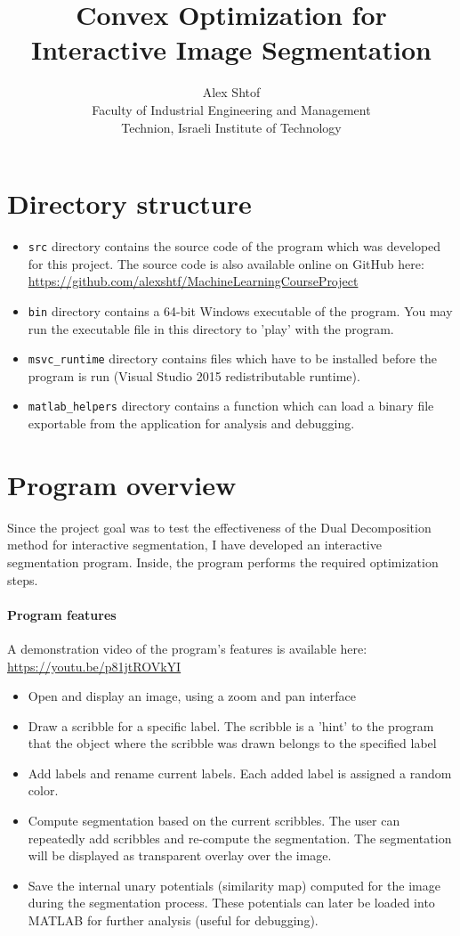 \documentclass[12pt,a4paper]{article}
\title{Convex Optimization for Interactive Image Segmentation}
\author{Alex Shtof \\
        Faculty of Industrial Engineering and Management \\
        Technion, Israeli Institute of Technology}
\begin{document}
\maketitle

\section{Directory structure}
\begin{itemize}
	\item \texttt{src} directory contains the source code of the program which was developed for this project. The source code is also available online on GitHub here: \href{https://github.com/alexshtf/MachineLearningCourseProject}{https://github.com/alexshtf/MachineLearningCourseProject}
	\item \texttt{bin} directory contains a 64-bit Windows executable of the program. You may run the executable file in this directory to 'play' with the program.
	\item \texttt{msvc\_runtime} directory contains files which have to be installed before the program is run (Visual Studio 2015 redistributable runtime). 
	\item \texttt{matlab\_helpers} directory contains a function which can load a binary file exportable from the application for analysis and debugging.
\end{itemize}


\section{Program overview}
Since the project goal was to test the effectiveness of the Dual Decomposition method for interactive segmentation, I have developed an interactive segmentation program. Inside, the program performs the required optimization steps. 

\paragraph{Program features}
A demonstration video of the program's features is available here: \href{https://youtu.be/p81jtROVkYI}{https://youtu.be/p81jtROVkYI}
\begin{itemize}
	\item Open and display an image, using a zoom and pan interface
	\item Draw a scribble for a specific label. The scribble is a 'hint' to the program that the object where the scribble was drawn belongs to the specified label
	\item Add labels and rename current labels. Each added label is assigned a random color.
	\item Compute segmentation based on the current scribbles. The user can repeatedly add scribbles and re-compute the segmentation. The segmentation will be displayed as transparent overlay over the image.
	\item Save the internal unary potentials (similarity map) computed for the image during the segmentation process. These potentials can later be loaded into MATLAB for further analysis (useful for debugging).
\end{itemize}
\end{document}
